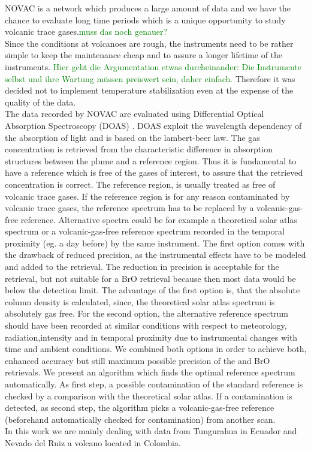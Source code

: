 NOVAC is a network which produces a large amount of data and we have the chance to evaluate long time periods which is a unique opportunity to study volcanic trace gases.\textcolor{green}{muss das noch genauer?}\\
Since the conditions at volcanoes are rough, the instruments need to be rather simple to keep the maintenance cheap and to assure a longer lifetime of the instruments. \textcolor{green}{Hier geht die Argumentation etwas durcheinander: Die Instrumente selbst und ihre Wartung müssen preiswert sein, daher einfach.} Therefore it was decided not to implement temperature stabilization even at the expense of the quality of the data.\\
%
\newline
%
The data recorded by NOVAC are evaluated using Differential Optical Absorption Spectroscopy (DOAS) \cite{platt2008differential}. DOAS exploit the wavelength dependency of the absorption of light and is based on the lambert-beer law. The gas concentration is retrieved from the characteristic difference in absorption structures between the plume and a reference region. Thus it is fundamental to have a reference which is free of the gases of interest, to assure that the retrieved concentration is correct.
%
\newline
%
The reference region, is usually treated as free of
volcanic trace gases. If the reference region is for any reason
contaminated by volcanic trace gases, the reference spectrum has to be
replaced by a volcanic-gas-free reference. Alternative spectra could be for example a
theoretical solar atlas spectrum or a volcanic-gas-free reference
spectrum recorded in the temporal proximity (eg. a day before) by the same instrument.
The first option comes with the drawback of reduced precision, as the
instrumental effects have to be modeled and added to the retrieval. The reduction in precision is acceptable for the  retrieval, but not suitable for a BrO retrieval because then most data would be below the detection limit. The advantage of the first option is, that the absolute column density is calculated, since, the theoretical solar atlas spectrum is absolutely gas free. For the second option, the alternative reference spectrum should
have been recorded at similar conditions with respect to meteorology,
radiation,intensity and in temporal proximity due to instrumental changes
with time and ambient conditions. We combined both options in order to
achieve both, enhanced accuracy but still maximum possible precision of
the  and BrO retrievals. We present an algorithm which finds the
optimal reference spectrum automatically. As first step, a possible 
contamination of the standard reference is checked by a comparison with
the theoretical solar atlas. If a contamination is detected, as second step,
the algorithm picks a volcanic-gas-free reference (beforehand
automatically checked for contamination) from another scan.\\
%
\newline
%
In this work we are mainly dealing with data from Tungurahua in Ecuador and Nevado del Ruiz a volcano located in Colombia.